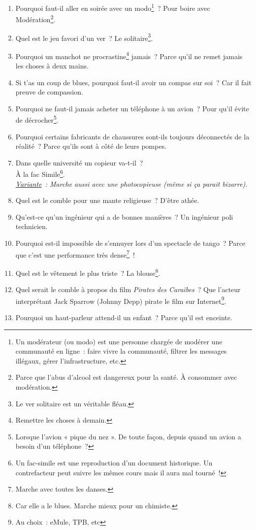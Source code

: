 \documentclass[10pt,a5paper,fullpage]{book}
\begin{document}
\begin{enumerate}
		\item Pourquoi faut-il aller en soirée avec un modo\footnote{Un modérateur (ou modo) est une personne chargée de modérer une communauté en ligne~: faire vivre la communauté, filtrer les messages illégaux, gérer l'infrastructure, etc.}~? Pour  boire avec Modération\footnote{Parce que l'abus d'alcool est dangereux pour la santé. À consommer avec modération.}. 
		\item Quel est le jeu favori d’un ver~? Le solitaire\footnote{Le ver solitaire est un véritable fléau.}.
		\item Pourquoi un manchot ne procrastine\footnote{Remettre les choses à demain.} jamais~? Parce qu'il ne remet jamais les choses à deux mains. 
		\item Si t'as un coup de blues, pourquoi faut-il avoir un compas sur soi~? Car il fait preuve de compassion.
		\item Pourquoi ne faut-il jamais acheter un téléphone à un avion~? Pour qu’il évite de décrocher\footnote{Lorsque l’avion « pique du nez ». De toute façon, depuis quand un avion a besoin d'un téléphone~?}.
		\item Pourquoi certains fabricants de chaussures sont-ils toujours déconnectés de la réalité~? Parce qu’ils sont à côté de leurs pompes.
		\item Dans quelle université un copieur va-t-il~? \\À la fac Simile\footnote{Un fac-simile est une reproduction d’un document historique. Un contrefacteur peut suivre les mêmes cours mais il aura mal tourné~!}.\\\textit{\underline{Variante}~: Marche aussi avec une photocopieuse (même si ça parait bizarre).}
		\item Quel est le comble pour une mante religieuse~? D’être athée.
		\item Qu’est-ce qu’un ingénieur qui a de bonnes manières~? Un ingénieur poli technicien.
		\item Pourquoi est-il impossible de s’ennuyer lors d’un spectacle de tango~? Parce que c’est une performance très dense\footnote{Marche avec toutes les danses.}~!
		\item Quel est le vêtement le plus triste~? La blouse\footnote{Car elle a le blues. Marche mieux pour un chimiste.}.
		\item Quel serait le comble à propos du film \textit{Pirates des Caraïbes}~? Que l'acteur interprétant Jack Sparrow (Johnny Depp) pirate le film sur Internet\footnote{Au choix~: eMule, TPB, etc}. 
		\item Pourquoi un haut-parleur attend-il un enfant~? Parce qu’il est enceinte.

\end{enumerate}
\end{document}
